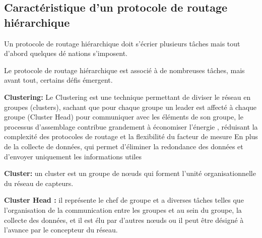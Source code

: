 \documentclass[paper=a4, fontsize=11pt]{scrartcl}
\numberwithin{equation}{section}		%
\numberwithin{figure}{section}			%
\numberwithin{table}{section}				%
\begin{document}
\subsection{ Caractéristique d'un protocole de routage hiérarchique }
Un protocole de routage hiérarchique doit s’écrier plusieurs tâches mais tout d'abord
quelques dé nations s’imposent.\par
Le protocole de routage hiérarchique est associé à de nombreuses tâches, mais avant tout,
certains défis émergent.\par
\textbf{ Clustering:} Le Clustering est une technique permettant de diviser le réseau en groupes
(clusters), sachant que pour chaque groupe un leader est affecté à chaque groupe (Cluster Head)
pour communiquer avec les éléments de son groupe, le processus d'assemblage contribue
grandement à économiser l'énergie , réduisant la complexité des protocoles de routage et la
flexibilité du facteur de mesure En plus de la collecte de données, qui permet d'éliminer la
redondance des données et d'envoyer uniquement les informations utiles\par
\textbf{ Cluster:} un cluster est un groupe de nœuds qui forment l'unité organisationnelle du réseau
de capteurs.\par
\textbf{Cluster Head : }il représente le chef de groupe et a diverses tâches telles que l'organisation
de la communication entre les groupes et au sein du groupe, la collecte des données, et il est élu
par d'autres nœuds ou il peut être désigné à l'avance par le concepteur du réseau.
\end{document}
